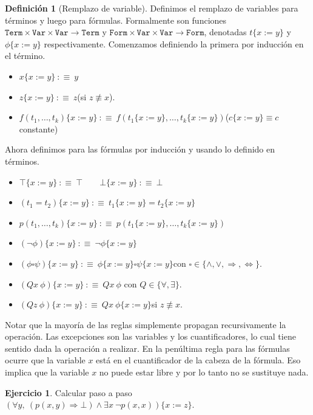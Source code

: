 \documentclass[a4paper, 12pt]{report}
\newcommand{\Ra}{\Rightarrow}
\newcommand{\Lra}{\Leftrightarrow}
\theoremstyle{definition}
\newtheorem{definicion}[teorema]{Definición}
\newtheorem{ejercicio}{Ejercicio}[section]
\begin{document}
\begin{definicion}[Remplazo de variable]
	Definimos el remplazo de variables para términos y luego para fórmulas. Formalmente son funciones $\mathtt{Term}\times\mathtt{Var}\times\mathtt{Var}\to\mathtt{Term}$ y $\mathtt{Form}\times\mathtt{Var}\times\mathtt{Var}\to\mathtt{Form}$, denotadas $t\{x:=y\}$ y $\phi\{x:=y\}$ respectivamente. Comenzamos definiendo la primera por inducción en el término.
	\begin{itemize}
		\item $x\{x:=y\} ~:\equiv~ y$
		\item $z\{x:=y\} ~:\equiv~ z$\quad(si $z\not\equiv x$).
		\item $f(t_1,\dots,t_k)\{x:=y\}~:\equiv~f(t_1\{x:=y\},\dots,t_k\{x:=y\})$\quad ($c\{x:=y\}\equiv c$ constante)
	\end{itemize}
	Ahora definimos para las fórmulas por inducción y usando lo definido en términos.
	\begin{itemize}
		\item $\top\{x:=y\}~:\equiv~\top\qquad \bot\{x:=y\}~:\equiv~\bot$
		\item $(t_1=t_2)\{x:=y\}~:\equiv~ t_1\{x:=y\}=t_2\{x:=y\}$
		\item $p(t_1,\dots,t_k)\{x:=y\}~:\equiv~p(t_1\{x:=y\},\dots,t_k\{x:=y\})$
		\item $(\lnot\phi)\{x:=y\}~:\equiv~\lnot\phi\{x:=y\}$
		\item $(\phi\square\psi)\{x:=y\}~:\equiv~\phi\{x:=y\}\square\psi\{x:=y\}$\quad con $\square\in\{\wedge,\vee,\Ra,\Lra\}$.
		\item $(Qx~\phi)\{x:=y\}~:\equiv~Qx~\phi$ \quad con $Q\in\{\forall,\exists\}$.
		\item $(Qz~\phi)\{x:=y\}~:\equiv~Qx~\phi\{x:=y\}$\quad si $z\not\equiv x$.
	\end{itemize}
\end{definicion}
Notar que la mayoría de las reglas simplemente propagan recursivamente la operación. Las excepciones son las variables y los cuantificadores, lo cual tiene sentido dada la operación a realizar. En la penúltima regla para las fórmulas ocurre que la variable $x$ está en el cuantificador de la cabeza de la fórmula. Eso implica que la variable $x$ no puede estar libre y por lo tanto no se sustituye nada.

\begin{ejercicio}
	Calcular paso a paso $(\forall y,~(p(x,y)\Ra\bot)\wedge\exists x~\lnot p(x,x))\{x:=z\}$.
\end{ejercicio}
\end{document}
